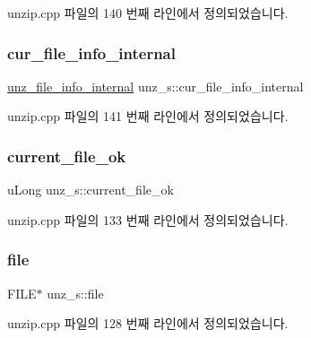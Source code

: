 unzip.\+cpp 파일의 140 번째 라인에서 정의되었습니다.

\mbox{\label{structunz__s_a36625697385b9a675f02a446fa5ba583}} 
\subsubsection{\texorpdfstring{cur\+\_\+file\+\_\+info\+\_\+internal}{cur\_file\_info\_internal}}
{\footnotesize\ttfamily \mbox{\hyperlink{unzip_8cpp_a8f7400cb2fdf408412d6f75accea8305}{unz\+\_\+file\+\_\+info\+\_\+internal}} unz\+\_\+s\+::cur\+\_\+file\+\_\+info\+\_\+internal}



unzip.\+cpp 파일의 141 번째 라인에서 정의되었습니다.

\mbox{\label{structunz__s_abe2244ba62db8b3251634e26183f1c9a}} 
\subsubsection{\texorpdfstring{current\+\_\+file\+\_\+ok}{current\_file\_ok}}
{\footnotesize\ttfamily u\+Long unz\+\_\+s\+::current\+\_\+file\+\_\+ok}



unzip.\+cpp 파일의 133 번째 라인에서 정의되었습니다.

\mbox{\label{structunz__s_ae3672e9d6fcd9741941ed1ba376f86c7}} 
\subsubsection{\texorpdfstring{file}{file}}
{\footnotesize\ttfamily F\+I\+LE$\ast$ unz\+\_\+s\+::file}



unzip.\+cpp 파일의 128 번째 라인에서 정의되었습니다.

\mbox{\label{structunz__s_a131303f89af11a26b53e99a58d6517cf}} 
